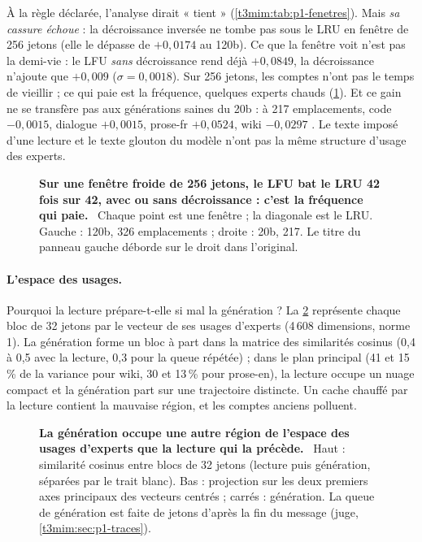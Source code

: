 À la règle déclarée, l'analyse dirait « tient » (\cref{t3mim:tab:p1-fenetres}). Mais \emph{sa cassure échoue} : la décroissance inversée ne tombe pas sous le LRU en fenêtre de 256 jetons (elle le dépasse de $+0{,}0174$ au 120b). Ce que la fenêtre voit n'est pas la demi-vie : le LFU \emph{sans} décroissance rend déjà $+0{,}0849$, la décroissance n'ajoute que $+0{,}009$ ($\sigma = 0{,}0018$). Sur 256 jetons, les comptes n'ont pas le temps de vieillir ; ce qui paie est la fréquence, quelques experts chauds (\cref{fig:t3-mim-p1-froides}). Et ce gain ne se transfère pas aux générations saines du 20b : à 217 emplacements, code $-0{,}0015$, dialogue $+0{,}0015$, prose-fr $+0{,}0524$, wiki $-0{,}0297$ \mes. Le texte imposé d'une lecture et le texte glouton du modèle n'ont pas la même structure d'usage des experts.

\begin{figure}[tbp]
\centering
{}
\caption[P1 : fenêtres froides, succès du LRU contre la politique]{\textbf{Sur une fenêtre froide de 256 jetons, le LFU bat le LRU 42 fois sur 42, avec ou sans décroissance : c'est la fréquence qui paie.} \mes~Chaque point est une fenêtre ; la diagonale est le LRU. Gauche : 120b, 326 emplacements ; droite : 20b, 217. Le titre du panneau gauche déborde sur le droit dans l'original. \HorsStyle{}}
\label{fig:t3-mim-p1-froides}
\end{figure}

\paragraph{L'espace des usages.} Pourquoi la lecture prépare-t-elle si mal la génération ? La \cref{fig:t3-mim-p1-topologie} représente chaque bloc de 32 jetons par le vecteur de ses usages d'experts (4\,608 dimensions, norme 1). La génération forme un bloc à part dans la matrice des similarités cosinus (0,4 à 0,5 avec la lecture, 0,3 pour la queue répétée) ; dans le plan principal (41 et 15\,\% de la variance pour wiki, 30 et 13\,\% pour prose-en), la lecture occupe un nuage compact et la génération part sur une trajectoire distincte. Un cache chauffé par la lecture contient la mauvaise région, et les comptes anciens polluent.

\begin{figure}[tbp]
\centering
{}
\caption[P1 : l'espace latent des blocs d'usages d'experts]{\textbf{La génération occupe une autre région de l'espace des usages d'experts que la lecture qui la précède.} \mes~Haut : similarité cosinus entre blocs de 32 jetons (lecture puis génération, séparées par le trait blanc). Bas : projection sur les deux premiers axes principaux des vecteurs centrés ; carrés : génération. La queue de génération est faite de jetons d'après la fin du message (juge, \cref{t3mim:sec:p1-traces}). \HorsStyle{}}
\label{fig:t3-mim-p1-topologie}
\end{figure}

